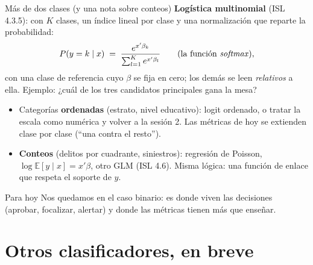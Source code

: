 \documentclass{beamer}
\newcommand{\E}{\mathbb{E}}
\newcommand{\1}{\mathbb{I}}
\begin{document}
\begin{frame}{Más de dos clases (y una nota sobre conteos)}
\small
\textbf{Logística multinomial} (ISL 4.3.5): con $K$ clases, un índice lineal por clase y una normalización que reparte la probabilidad:
\[ P(y = k \mid x) \;=\; \frac{e^{x'\beta_k}}{\sum_{l=1}^{K} e^{x'\beta_l}} \qquad (\text{la función \emph{softmax}}), \]
con una clase de referencia cuyo $\beta$ se fija en cero; los demás se leen \emph{relativos} a ella. Ejemplo: ¿cuál de los tres candidatos principales gana la mesa?
\pause
\begin{itemize}\itemsep4pt
  \item Categorías \textbf{ordenadas} (estrato, nivel educativo): logit ordenado, o tratar la escala como numérica y volver a la sesión 2. Las métricas de hoy se extienden clase por clase (``una contra el resto''). \pause
  \item \textbf{Conteos} (delitos por cuadrante, siniestros): regresión de Poisson, $\log \E[y \mid x] = x'\beta$, otro GLM (ISL 4.6). Misma lógica: una función de enlace que respeta el soporte de $y$.
\end{itemize}
\pause
\begin{block}{Para hoy}
Nos quedamos en el caso binario: es donde viven las decisiones (aprobar, focalizar, alertar) y donde las métricas tienen más que enseñar.
\end{block}
\end{frame}


\section{Otros clasificadores, en breve}
\begin{frame}[noframenumbering]
\tableofcontents[currentsection]
\end{frame}
\end{document}
